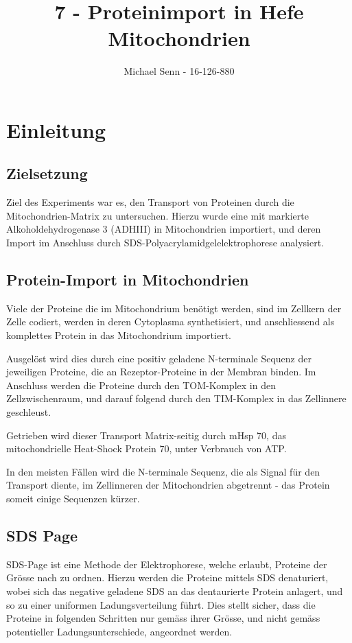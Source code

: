 \documentclass[a4paper,german]{scrreprt}
\title{7 - Proteinimport in Hefe Mitochondrien}
\author{Michael Senn \maillink{michael.senn@students.unibe.ch} - 16-126-880}
\date{\printdate}
\begin{document}
\maketitle

\chapter{Einleitung}

\section{Zielsetzung}

Ziel des Experiments war es, den Transport von Proteinen durch die
Mitochondrien-Matrix zu untersuchen. Hierzu wurde eine mit
 markierte Alkoholdehydrogenase 3 (ADHIII) in
Mitochondrien importiert, und deren Import im Anschluss durch
SDS-Polyacrylamidgelelektrophorese analysiert.

\section{Protein-Import in Mitochondrien}

Viele der Proteine die im Mitochondrium benötigt werden, sind im Zellkern der
Zelle codiert, werden in deren Cytoplasma synthetisiert, und anschliessend als
komplettes Protein in das Mitochondrium importiert.

Ausgelöst wird dies durch eine positiv geladene N-terminale Sequenz der
jeweiligen Proteine, die an Rezeptor-Proteine in der Membran binden. Im
Anschluss werden die Proteine durch den TOM-Komplex in den Zellzwischenraum,
und darauf folgend durch den TIM-Komplex in das Zellinnere
geschleust\cite{protein_transport}.

Getrieben wird dieser Transport Matrix-seitig durch mHsp 70, das
mitochondrielle Heat-Shock Protein 70, unter Verbrauch von ATP.

In den meisten Fällen wird die N-terminale Sequenz, die als Signal für den
Transport diente, im Zellinneren der Mitochondrien abgetrennt - das Protein
someit einige Sequenzen kürzer.

\section{SDS Page}

SDS-Page ist eine Methode der Elektrophorese, welche erlaubt, Proteine der
Grösse nach zu ordnen. Hierzu werden die Proteine mittels SDS denaturiert,
wobei sich das negative geladene SDS an das dentaurierte Protein anlagert, und
so zu einer uniformen Ladungsverteilung führt. Dies stellt sicher, dass die
Proteine in folgenden Schritten nur gemäss ihrer Grösse, und nicht gemäss
potentieller Ladungsunterschiede, angeordnet werden.
\end{document}
